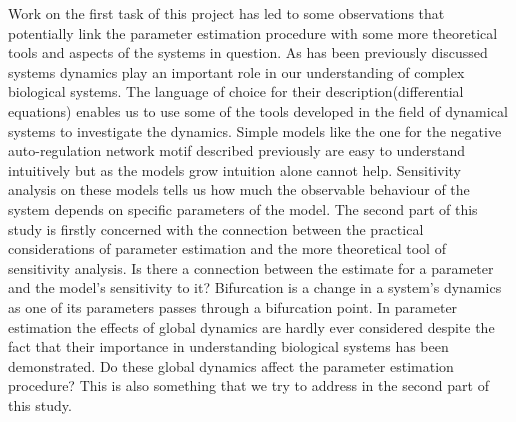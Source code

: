 \documentclass[12pt,a4paper,titlepage]{article}
\begin{document}
Work on the first task of this project has led to some observations that potentially link the parameter estimation procedure with some more theoretical tools and aspects of the systems in question.  
As has been previously discussed systems dynamics play an important role in our understanding of complex biological systems. The language of choice for their description(differential equations) enables us to use some of the tools developed in the field of dynamical systems to investigate the dynamics. Simple models like the one for the negative auto-regulation network motif described previously are easy to understand intuitively but as the models grow intuition alone cannot help. Sensitivity analysis on these models tells us how much the observable behaviour of the system depends on specific parameters of the model. The second part of this study is firstly concerned with the connection between the practical considerations of parameter estimation and the more theoretical tool of sensitivity analysis. Is there a connection between the estimate for a parameter and the model's sensitivity to it? Bifurcation is a change in a system's dynamics as one of its parameters passes through a bifurcation point. In parameter estimation the effects of global dynamics are hardly ever considered despite the fact that their importance in understanding biological systems has been demonstrated\cite{}. Do these global dynamics affect the parameter estimation procedure? This is also something that we try to address in the second part of this study.


\end{document}
